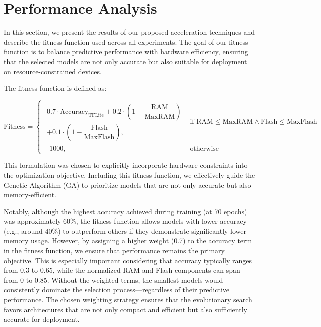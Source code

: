 \chapter{Performance Analysis}

In this section, we present the results of our proposed acceleration techniques and describe the fitness function used across all experiments. The goal of our fitness function is to balance predictive performance with hardware efficiency, ensuring that the selected models are not only accurate but also suitable for deployment on resource-constrained devices.

The fitness function is defined as:

\begin{equation}
\text{Fitness} =
\begin{cases}
\begin{aligned}
0.7 \cdot \text{Accuracy}_{\text{TFLite}} 
+ 0.2 \cdot \left(1 - \dfrac{\text{RAM}}{\text{MaxRAM}}\right) \\
+ 0.1 \cdot \left(1 - \dfrac{\text{Flash}}{\text{MaxFlash}}\right),
\end{aligned}
& \text{if } \text{RAM} \leq \text{MaxRAM} \land \text{Flash} \leq \text{MaxFlash} \\
-1000, & \text{otherwise}
\end{cases}
\label{eq:fitness_function}
\end{equation}



This formulation was chosen to explicitly incorporate hardware constraints into the optimization objective. Including this fitness function, we effectively guide the Genetic Algorithm (GA) to prioritize models that are not only accurate but also memory-efficient.

Notably, although the highest accuracy achieved during training (at 70 epochs) was approximately 60\%, the fitness function allows models with lower accuracy (e.g., around 40\%) to outperform others if they demonstrate significantly lower memory usage. However, by assigning a higher weight (0.7) to the accuracy term in the fitness function, we ensure that performance remains the primary objective. This is especially important considering that accuracy typically ranges from 0.3 to 0.65, while the normalized RAM and Flash components can span from 0 to 0.85. Without the weighted terms, the smallest models would consistently dominate the selection process—regardless of their predictive performance. The chosen weighting strategy ensures that the evolutionary search favors architectures that are not only compact and efficient but also sufficiently accurate for deployment.

